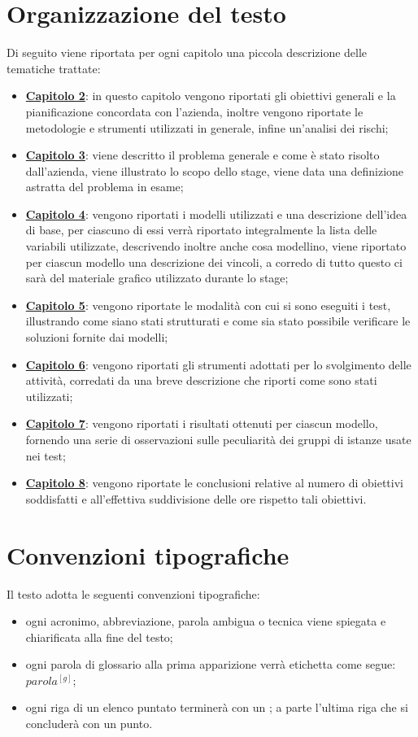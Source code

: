 \section{Organizzazione del testo}
Di seguito viene riportata per ogni capitolo una piccola descrizione delle tematiche trattate:
\begin{itemize}
	\item \hyperlink{(chap:capitolo2)}{\textbf{Capitolo 2}}: in questo capitolo vengono riportati gli obiettivi generali e la pianificazione concordata con l'azienda, inoltre vengono riportate le metodologie e strumenti utilizzati in generale, infine un'analisi dei rischi;
	\item \hyperlink{(chap:capitolo3)}{\textbf{Capitolo 3}}: viene descritto il problema generale e come è stato risolto dall'azienda, viene illustrato lo scopo dello stage, viene data una definizione astratta del problema in esame;
	\item \hyperlink{(chap:capitolo4)}{\textbf{Capitolo 4}}: vengono riportati i modelli utilizzati e una descrizione dell'idea di base, per ciascuno di essi verrà riportato integralmente la lista delle variabili utilizzate, descrivendo inoltre anche cosa modellino, viene riportato per ciascun modello una descrizione dei vincoli, a corredo di tutto questo ci sarà del materiale grafico utilizzato durante lo stage;
	\item \hyperlink{(chap:capitolo5)}{\textbf{Capitolo 5}}: vengono riportate le modalità con cui si sono eseguiti i test, illustrando come siano stati strutturati e come sia stato possibile verificare le soluzioni fornite dai modelli;
	\item \hyperlink{(chap:capitolo6)}{\textbf{Capitolo 6}}: vengono riportati gli strumenti adottati per lo svolgimento delle attività, corredati da una breve descrizione che riporti come sono stati utilizzati;
	\item \hyperlink{(chap:capitolo7)}{\textbf{Capitolo 7}}: vengono riportati i risultati ottenuti per ciascun modello, fornendo una serie di osservazioni sulle peculiarità dei gruppi di istanze usate nei test;
	\item \hyperlink{(chap:capitolo8)}{\textbf{Capitolo 8}}: vengono riportate le conclusioni relative al numero di obiettivi soddisfatti e all'effettiva suddivisione delle ore rispetto tali obiettivi.

\end{itemize}
\section{Convenzioni tipografiche}
Il testo adotta le seguenti convenzioni tipografiche:
\begin{itemize}
	\item ogni acronimo, abbreviazione, parola ambigua o tecnica viene spiegata e chiarificata alla fine del testo;
	\item ogni parola di glossario alla prima apparizione verrà etichetta come segue: $parola^{[g]}$;
	\item ogni riga di un elenco puntato terminerà con un ; a parte l'ultima riga che si concluderà con un punto.
\end{itemize}
